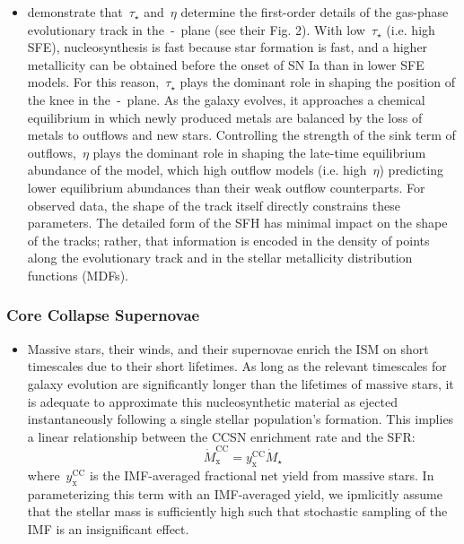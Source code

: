 \documentclass[ms.tex]{subfiles}
\begin{document}
\begin{itemize}
\begin{itemize}
		\item \citet{Weinberg2017} demonstrate that~$\tau_\star$ and~$\eta$
		determine the first-order details of the gas-phase evolutionary track
		in the~\afe-\feh~plane (see their Fig. 2).
		With low~$\tau_\star$ (i.e. high SFE), nucleosynthesis is fast because
		star formation is fast, and a higher metallicity can be obtained before
		the onset of SN Ia than in lower SFE models.
		For this reason,~$\tau_\star$ plays the dominant role in shaping the
		position of the knee in the~\afe-\feh~plane.
		As the galaxy evolves, it approaches a chemical equilibrium in which
		newly produced metals are balanced by the loss of metals to outflows
		and new stars.
		Controlling the strength of the sink term of outflows,~$\eta$ plays
		the dominant role in shaping the late-time equilibrium abundance of the
		model, which high outflow models (i.e. high~$\eta$) predicting lower
		equilibrium abundances than their weak outflow counterparts.
		For observed data, the shape of the track itself directly constrains
		these parameters.
		The detailed form of the SFH has minimal impact on the shape of the
		tracks; rather, that information is encoded in the density of points
		along the evolutionary track and in the stellar metallicity
		distribution functions (MDFs).

	\end{itemize}

\end{itemize}

\subsubsection{Core Collapse Supernovae}
\label{sec:methods:onezone:ccsne}

\begin{itemize}

	\item Massive stars, their winds, and their supernovae enrich the ISM on
	short timescales due to their short lifetimes.
	As long as the relevant timescales for galaxy evolution are significantly
	longer than the lifetimes of massive stars, it is adequate to approximate
	this nucleosynthetic material as ejected instantaneously following a single
	stellar population's formation.
	This implies a linear relationship between the CCSN enrichment rate and
	the SFR:
	\begin{equation}
	\label{eq:mdot_cc}
	\dot{M}_\text{x}^\text{CC} = y_\text{x}^\text{CC}\dot{M}_\star
	\end{equation}
	where~$y_\text{x}^\text{CC}$ is the IMF-averaged fractional net yield from
	massive stars.
	In parameterizing this term with an IMF-averaged yield, we ipmlicitly assume
	that the stellar mass is sufficiently high such that stochastic sampling of
	the IMF is an insignificant effect.

\end{itemize}
\end{document}
